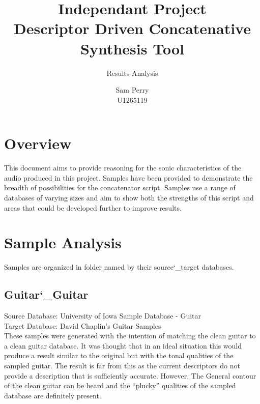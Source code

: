\documentclass{scrartcl}
\begin{document}
    \title{Independant Project\\Descriptor Driven Concatenative Synthesis Tool}
    \subtitle{\LARGE{Results Analysis}}
    \author{Sam Perry\\U1265119}
    \date{}

    \maketitle

    \section{Overview}
    This document aims to provide reasoning for the sonic characteristics of
    the audio produced in this project. Samples have been provided to
    demonstrate the breadth of possibilities for the concatenator script.
    Samples use a range of databases of varying sizes and aim to show both the
    strengths of this script and areas that could be developed further to
    improve results.

    \section{Sample Analysis}
    Samples are organized in folder named by their source\char`_target databases.
    
    \subsection{Guitar\char`_Guitar}
    Source Database: University of Iowa Sample Database - Guitar\\
    Target Database: David Chaplin's Guitar Samples\\

    These samples were generated with the intention of matching the clean
    guitar to a clean guitar database. It was thought that in an ideal
    situation this would produce a result similar to the original but with the
    tonal qualities of the sampled guitar. The result is far from this as the
    current descriptors do not provide a description that is sufficiently
    accurate. However, The General contour of the clean guitar can be heard and
    the ``plucky'' qualities of the sampled database are definitely present.
\end{document}
